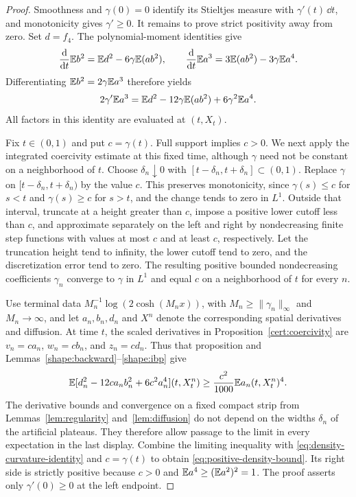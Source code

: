 \begin{proof}
Smoothness and $\gamma(0)=0$ identify its Stieltjes measure with
$\gamma'(t)\,\dd t$, and monotonicity gives $\gamma'\geq0$.
It remains to prove strict positivity away from zero. Set $d=f_4$.
The polynomial-moment identities give
\[
 \frac{\mathrm d}{\mathrm d t}\mathbb E b^2=\mathbb E d^2-6\gamma\mathbb E(ab^2),
 \qquad
 \frac{\mathrm d}{\mathrm d t}\mathbb E a^3=3\mathbb E(ab^2)-3\gamma\mathbb E a^4.
\]
Differentiating $\mathbb E b^2=2\gamma\mathbb E a^3$ therefore yields
\begin{equation}\label{eq:density-curvature-identity}
 2\gamma'\mathbb E a^3
  =\mathbb E d^2-12\gamma\mathbb E(ab^2)+6\gamma^2\mathbb E a^4.
\end{equation}
All factors in this identity are evaluated at $(t,X_t)$.

Fix $t\in(0,1)$ and put $c=\gamma(t)$. Full support implies
$c>0$. We next apply the integrated coercivity estimate at this fixed
time, although $\gamma$ need not be constant on a neighborhood of $t$.
Choose $\delta_n\downarrow0$ with
$[t-\delta_n,t+\delta_n]\subset(0,1)$. Replace $\gamma$ on
$[t-\delta_n,t+\delta_n)$ by the value $c$. This preserves
monotonicity, since $\gamma(s)\leq c$ for $s<t$ and
$\gamma(s)\geq c$ for $s>t$, and the change tends to zero in $L^1$.
Outside that interval, truncate at a height greater than $c$, impose
a positive lower cutoff less than $c$, and approximate separately on
the left and right by nondecreasing finite step functions with values
at most $c$ and at least $c$, respectively. Let the truncation height
tend to infinity, the lower cutoff tend to zero, and the discretization
error tend to zero. The resulting positive bounded nondecreasing
coefficients $\gamma_n$ converge to $\gamma$ in $L^1$ and equal $c$
on a neighborhood of $t$ for every $n$.

Use terminal data $M_n^{-1}\log(2\cosh(M_nx))$, with
$M_n\geq\|\gamma_n\|_\infty$ and $M_n\to\infty$, and let
$a_n,b_n,d_n$ and $X^n$ denote the corresponding spatial derivatives
and diffusion. At time $t$, the scaled derivatives in
Proposition~\ref{cert:coercivity} are
$v_n=ca_n$, $w_n=cb_n$, and $z_n=cd_n$. Thus that proposition and
Lemmas~\ref{shape:backward}--\ref{shape:ibp} give
\[
 \mathbb E[d_n^2-12c a_n b_n^2+6c^2a_n^4](t,X_t^n)
       \geq\frac{c^2}{1000}\mathbb E a_n(t,X_t^n)^4.
\]
The derivative bounds and convergence on a fixed compact strip from
Lemmas~\ref{lem:regularity} and~\ref{lem:diffusion} do not depend on
the widths $\delta_n$ of the artificial plateaus. They therefore
allow passage to the limit in every expectation in the last display.
Combine the limiting inequality with
\eqref{eq:density-curvature-identity} and $c=\gamma(t)$ to obtain
\eqref{eq:positive-density-bound}. Its right side is strictly positive
because $c>0$ and $\mathbb E a^4\geq(\mathbb E a^2)^2=1$. The proof asserts only
$\gamma'(0)\geq0$ at the left endpoint.
\end{proof}
